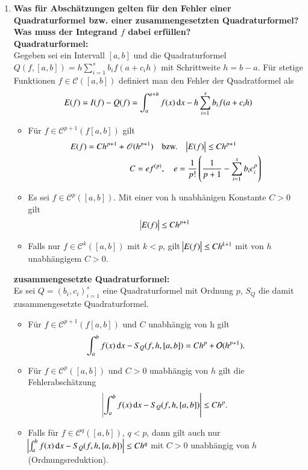 \begin{enumerate}
		\item \textbf{Was für Abschätzungen gelten für den Fehler einer Quadraturformel bzw. einer zusammengesetzten Quadraturformel? Was muss der Integrand $f$ dabei erfüllen?} \\
			\textbf{Quadraturformel:}\\
			Gegeben sei ein Intervall \([a,b]\) und die Quadraturformel \(Q(f,[a,b])=h\sum_{i=1}^{s}b_if(a+c_ih)\) mit Schrittweite \(h=b-a\). Für stetige Funktionen \(f\in\mathscr{C}([a,b])\) definiert man den Fehler der Quadratformel als
			\begin{align*}
				E(f)=I(f)-Q(f)=\int_{a}^{a+h}f(x)\dif{x}-h\sum_{i=1}^{s}b_if(a+c_ih)
			\end{align*}
			\begin{itemize}
				\item Für \(f\in\mathscr{C}^{p+1}(f[a,b])\) gilt
					\begin{align*}
						E(f)=Ch^{p+1}+\mathscr{O}(h^{p+1}) \quad &\text{bzw.} \quad \abs{E(f)}\leq Ch^{p+1}\\
						C=ef^{(p)}&, \quad e=\frac{1}{p!}\left(\frac{1}{p+1}-\sum_{i=1}^{s}b_ic_i^p\right)
					\end{align*}
				\item Es sei \(f\in\mathscr{C}^p([a,b])\). Mit einer von h unabhänigen Konstante \(C>0\) gilt
					\begin{align*}
						\abs{E(f)}\leq Ch^{p+1}
					\end{align*}
				\item Falls nur \(f\in\mathscr{C}^k([a,b])\) mit \(k<p\), gilt \(\abs{E(f)}\leq Ch^{k+1}\) mit von \(h\) unabhängigem \(C>0\).
			\end{itemize}
			
			\textbf{zusammengesetzte Quadraturformel:}\\
			Es sei \(Q=(b_i,c_i)_{i=1}^s\) eine Quadraturformel mit Ordnung \(p\), \(S_Q\) die damit zusammengesetzte Quadraturformel.
			\begin{itemize}
				\item Für \(f\in\mathscr{C}^{p+1}(f[a,b])\) und \(C\) unabhängig von h gilt
					\begin{align*}
						\int_{a}^{b}f(x)\dif{x}-S_Q(f,h,[a,b])=Ch^p+\mathcal{O}(h^{p+1}).
					\end{align*}
				\item Für \(f\in\mathscr{C}^p([a,b])\) und \(C>0\) unabhängig von \(h\) gilt die Fehlerabschätzung
					\begin{align*}
						\abs{\int_{a}^{b}f(x)\dif{x}-S_Q(f,h,[a,b])}\leq Ch^p.
					\end{align*}
				\item Falls für \(f\in\mathscr{C}^q([a,b])\), \(q<p\), dann gilt auch nur \(\abs{\int_{a}^{b}f(x)\dif{x}-S_Q(f,h,[a,b])}\leq Ch^q\) mit \(C>0\) unabhängig von \(h\) (Ordnungsreduktion).
			\end{itemize} 
		

\end{enumerate}
